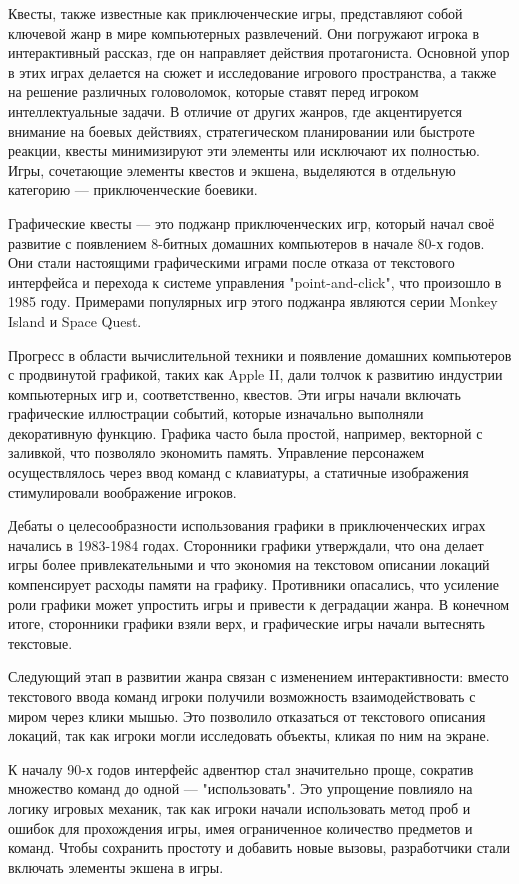 Квесты, также известные как приключенческие игры, представляют собой ключевой жанр в мире компьютерных развлечений. Они погружают игрока в интерактивный рассказ, где он направляет действия протагониста. Основной упор в этих играх делается на сюжет и исследование игрового пространства, а также на решение различных головоломок, которые ставят перед игроком интеллектуальные задачи. В отличие от других жанров, где акцентируется внимание на боевых действиях, стратегическом планировании или быстроте реакции, квесты минимизируют эти элементы или исключают их полностью. Игры, сочетающие элементы квестов и экшена, выделяются в отдельную категорию — приключенческие боевики.

Графические квесты — это поджанр приключенческих игр, который начал своё развитие с появлением 8-битных домашних компьютеров в начале 80-х годов. Они стали настоящими графическими играми после отказа от текстового интерфейса и перехода к системе управления "point-and-click", что произошло в 1985 году. Примерами популярных игр этого поджанра являются серии Monkey Island и Space Quest.

Прогресс в области вычислительной техники и появление домашних компьютеров с продвинутой графикой, таких как Apple II, дали толчок к развитию индустрии компьютерных игр и, соответственно, квестов. Эти игры начали включать графические иллюстрации событий, которые изначально выполняли декоративную функцию. Графика часто была простой, например, векторной с заливкой, что позволяло экономить память. Управление персонажем осуществлялось через ввод команд с клавиатуры, а статичные изображения стимулировали воображение игроков.

Дебаты о целесообразности использования графики в приключенческих играх начались в 1983-1984 годах. Сторонники графики утверждали, что она делает игры более привлекательными и что экономия на текстовом описании локаций компенсирует расходы памяти на графику. Противники опасались, что усиление роли графики может упростить игры и привести к деградации жанра. В конечном итоге, сторонники графики взяли верх, и графические игры начали вытеснять текстовые.

Следующий этап в развитии жанра связан с изменением интерактивности: вместо текстового ввода команд игроки получили возможность взаимодействовать с миром через клики мышью. Это позволило отказаться от текстового описания локаций, так как игроки могли исследовать объекты, кликая по ним на экране.

К началу 90-х годов интерфейс адвентюр стал значительно проще, сократив множество команд до одной — "использовать". Это упрощение повлияло на логику игровых механик, так как игроки начали использовать метод проб и ошибок для прохождения игры, имея ограниченное количество предметов и команд. Чтобы сохранить простоту и добавить новые вызовы, разработчики стали включать элементы экшена в игры.

